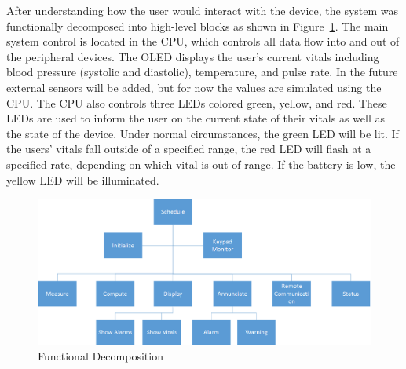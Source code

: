 \documentclass[12pt]{article} %
\begin{document}
After understanding how the user would interact with the device, the system was
functionally decomposed into high-level blocks as shown in
Figure~\ref{fig:func}.  The main system control is located in the CPU, which
controls all data flow into and out of the peripheral devices.  The OLED
displays the user's current vitals including blood pressure (systolic and
diastolic), temperature, and pulse rate.  In the future external sensors will
be added, but for now the values are simulated using the CPU.  The CPU also
controls three LEDs colored green, yellow, and red.  These LEDs are used to
inform the user on the current state of their vitals as well as the state of
the device.  Under normal circumstances, the green LED will be lit.  If the
users' vitals fall outside of a specified range, the red LED will flash at a
specified rate, depending on which vital is out of range.  If the battery is
low, the yellow LED will be illuminated.

\begin{figure}[h]
    \centering
    \includegraphics[width=\textwidth]{../design/Functional_decomposition}
    \caption{Functional Decomposition}
    \label{fig:func}
\end{figure}
\end{document}
